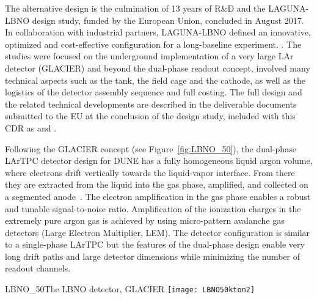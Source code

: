 
The alternative design is the %
culmination of 13 years of R\&D and %
the LAGUNA-LBNO design study, funded by the European Union, 
concluded in August 2017.  In collaboration with industrial partners,
LAGUNA-LBNO defined  an innovative, optimized and cost-effective configuration for
a long-baseline experiment. . 
%
The studies  were focused on the underground
implementation of a very large LAr detector (GLACIER) and
beyond the dual-phase readout concept, involved many technical aspects 
such as the tank, the field cage and the cathode, as well as the logistics of 
the detector assembly sequence and full costing. The full design and
the related technical developments are described in the deliverable
documents submitted to the EU at the conclusion of the design study,
included with this CDR as \anxlbnoa and \anxlbnob.


Following the GLACIER concept \cite{LAGUNA-LBNO-deliv} (see
Figure~\ref{fig:LBNO_50}), 
the dual-phase LArTPC detector design for DUNE has a fully
homogeneous liquid argon volume, where electrons drift vertically
towards the liquid-vapor interface. From there they are extracted from
the liquid into the gas phase, amplified, and collected on a segmented
anode~\cite{Badertscher:2013wm,Badertscher:2012dq,Badertscher:2010zg}. The
electron amplification in the gas phase enables a robust and tunable
signal-to-noise ratio. Amplification of the ionization charges in the
extremely pure argon gas is achieved by using micro-pattern avalanche
gas detectors (Large Electron Multiplier, LEM). The detector
configuration is similar to a single-phase LArTPC but the features   of
the dual-phase design enable very long drift paths and large detector
dimensions  while minimizing the number of readout channels.

\begin{cdrfigure}{LBNO_50}{The  LBNO detector, GLACIER}
\texttt{[image: LBNO50kton2]}
\end{cdrfigure}

